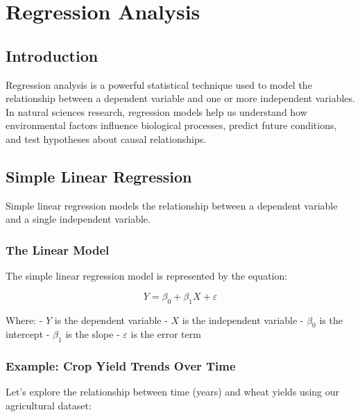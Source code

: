 \documentclass[
  letterpaper,
]{book}
\begin{document}
\chapter{Regression Analysis}\label{regression-analysis-1}

\section{Introduction}\label{introduction-6}

Regression analysis is a powerful statistical technique used to model
the relationship between a dependent variable and one or more
independent variables. In natural sciences research, regression models
help us understand how environmental factors influence biological
processes, predict future conditions, and test hypotheses about causal
relationships.

\section{Simple Linear Regression}\label{simple-linear-regression}

Simple linear regression models the relationship between a dependent
variable and a single independent variable.

\subsection{The Linear Model}\label{the-linear-model}

The simple linear regression model is represented by the equation:

\[Y = \beta_0 + \beta_1X + \varepsilon\]

Where: - \(Y\) is the dependent variable - \(X\) is the independent
variable - \(\beta_0\) is the intercept - \(\beta_1\) is the slope -
\(\varepsilon\) is the error term

\subsection{Example: Crop Yield Trends Over
Time}\label{example-crop-yield-trends-over-time}

Let's explore the relationship between time (years) and wheat yields
using our agricultural dataset:
\end{document}
